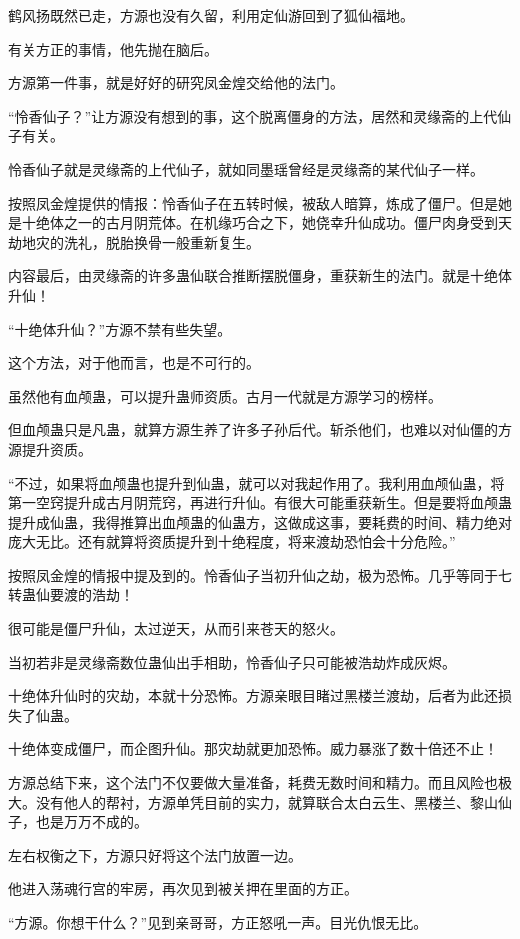 \begin{this_body}
鹤风扬既然已走，方源也没有久留，利用定仙游回到了狐仙福地。

有关方正的事情，他先抛在脑后。

方源第一件事，就是好好的研究凤金煌交给他的法门。

“怜香仙子？”让方源没有想到的事，这个脱离僵身的方法，居然和灵缘斋的上代仙子有关。

怜香仙子就是灵缘斋的上代仙子，就如同墨瑶曾经是灵缘斋的某代仙子一样。

按照凤金煌提供的情报：怜香仙子在五转时候，被敌人暗算，炼成了僵尸。但是她是十绝体之一的古月阴荒体。在机缘巧合之下，她侥幸升仙成功。僵尸肉身受到天劫地灾的洗礼，脱胎换骨一般重新复生。

内容最后，由灵缘斋的许多蛊仙联合推断摆脱僵身，重获新生的法门。就是十绝体升仙！

“十绝体升仙？”方源不禁有些失望。

这个方法，对于他而言，也是不可行的。

虽然他有血颅蛊，可以提升蛊师资质。古月一代就是方源学习的榜样。

但血颅蛊只是凡蛊，就算方源生养了许多子孙后代。斩杀他们，也难以对仙僵的方源提升资质。

“不过，如果将血颅蛊也提升到仙蛊，就可以对我起作用了。我利用血颅仙蛊，将第一空窍提升成古月阴荒窍，再进行升仙。有很大可能重获新生。但是要将血颅蛊提升成仙蛊，我得推算出血颅蛊的仙蛊方，这做成这事，要耗费的时间、精力绝对庞大无比。还有就算将资质提升到十绝程度，将来渡劫恐怕会十分危险。”

按照凤金煌的情报中提及到的。怜香仙子当初升仙之劫，极为恐怖。几乎等同于七转蛊仙要渡的浩劫！

很可能是僵尸升仙，太过逆天，从而引来苍天的怒火。

当初若非是灵缘斋数位蛊仙出手相助，怜香仙子只可能被浩劫炸成灰烬。

十绝体升仙时的灾劫，本就十分恐怖。方源亲眼目睹过黑楼兰渡劫，后者为此还损失了仙蛊。

十绝体变成僵尸，而企图升仙。那灾劫就更加恐怖。威力暴涨了数十倍还不止！

方源总结下来，这个法门不仅要做大量准备，耗费无数时间和精力。而且风险也极大。没有他人的帮衬，方源单凭目前的实力，就算联合太白云生、黑楼兰、黎山仙子，也是万万不成的。

左右权衡之下，方源只好将这个法门放置一边。

他进入荡魂行宫的牢房，再次见到被关押在里面的方正。

“方源。你想干什么？”见到亲哥哥，方正怒吼一声。目光仇恨无比。


\end{this_body}
